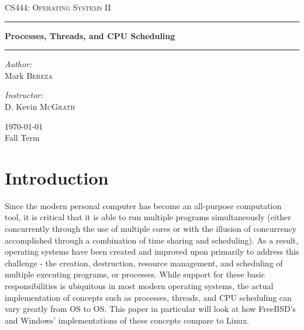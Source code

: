 \documentclass[onecolumn, draftclsnofoot,10pt, compsoc]{IEEEtran}
\begin{document}
\begin{titlepage}
\begin{center}

\vspace*{50mm}

\textsc{\LARGE CS444: Operating Systems II}\\[1.5cm]

\hrule
\vspace{5mm}
{ \huge \bfseries Processes, Threads, and CPU Scheduling \\[0.9cm] }
\hrule 
\vspace{5mm}

\noindent
\begin{minipage}{0.4\textwidth}

\begin{flushleft} \large
\emph{Author:}\\
Mark \textsc{Bereza}
\end{flushleft}
\end{minipage}%
\begin{minipage}{0.4\textwidth}
\begin{flushright} \large
\emph{Instructor:} \\
D. Kevin \textsc{McGrath}
\end{flushright}

\end{minipage}

\vspace*{\fill}
{\large \today}\\
{\large Fall Term}

\end{center}
\end{titlepage}
  
\tableofcontents
\newpage

\section{Introduction}
Since the modern personal computer has become an all-purpose computation tool, it is critical that it is able to run multiple programs simultaneously (either concurrently through the use of multiple cores or with the illusion of concurrency accomplished through a combination of time sharing and scheduling). As a result, operating systems have been created and improved upon primarily to address this challenge - the creation, destruction, resource management, and scheduling of multiple executing programs, or processes. While support for these basic responsibilities is ubiquitous in most modern operating systems, the actual implementation of concepts such as processes, threads, and CPU scheduling can vary greatly from OS to OS. This paper in particular will look at how FreeBSD's and Windows' implementations of these concepts compare to Linux.
\end{document}
